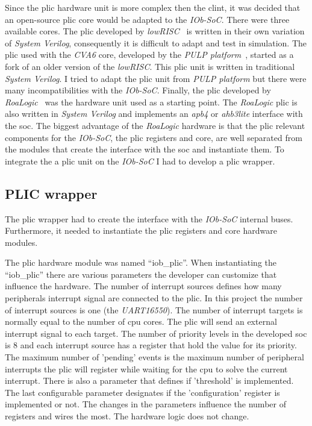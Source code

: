 Since the \acrshort{plic} hardware unit is more complex then the \acrshort{clint}, it was decided that an open-source \acrshort{plic} core would be adapted to the \textit{IOb-SoC}. There were three available cores. The \acrshort{plic} developed by \textit{lowRISC}~\cite{lowrisc_plic} is written in their own variation of \textit{System Verilog}, consequently it is difficult to adapt and test in simulation. The \acrshort{plic} used with the \textit{CVA6} core, developed by the \textit{PULP platform}~\cite{pulp_plic}, started as a fork of an older version of the \textit{lowRISC}. This \acrshort{plic} unit is written in traditional \textit{System Verilog}. I tried to adapt the \acrshort{plic} unit from \textit{PULP platform} but there were many incompatibilities with the \textit{IOb-SoC}. Finally, the \acrshort{plic} developed by \textit{RoaLogic}~\cite{roalogic_plic} was the hardware unit used as a starting point. The \textit{RoaLogic} \acrshort{plic} is also written in \textit{System Verilog} and implements an \textit{apb4} or \textit{ahb3lite} interface with the \acrshort{soc}. The biggest advantage of the \textit{RoaLogic} hardware is that the \acrshort{plic} relevant components for the \textit{IOb-SoC}, the \acrshort{plic} registers and core, are well separated from the modules that create the interface with the \acrshort{soc} and instantiate them. To integrate the a \acrshort{plic} unit on the \textit{IOb-SoC} I had to develop a \acrshort{plic} wrapper.

\subsection{PLIC wrapper}
The \acrshort{plic} wrapper had to create the interface with the \textit{IOb-SoC} internal buses. Furthermore, it needed to instantiate the \acrshort{plic} registers and core hardware modules.

The \acrshort{plic} hardware module was named \enquote{iob\_plic}. When instantiating the \enquote{iob\_plic} there are various parameters the developer can customize that influence the hardware. The number of interrupt sources defines how many peripherals interrupt signal are connected to the \acrshort{plic}. In this project the number of interrupt sources is one (the \textit{UART16550}). The number of interrupt targets is normally equal to the number of \acrshort{cpu} cores. The \acrshort{plic} will send an external interrupt signal to each target. The number of priority levels in the developed \acrshort{soc} is 8 and each interrupt source has a register that hold the value for its priority. The maximum number of 'pending' events is the maximum number of peripheral interrupts the \acrshort{plic} will register while waiting for the \acrshort{cpu} to solve the current interrupt. There is also a parameter that defines if 'threshold' is implemented. The last configurable parameter designates if the 'configuration' register is implemented or not. The changes in the parameters influence the number of registers and wires the most. The hardware logic does not change.

